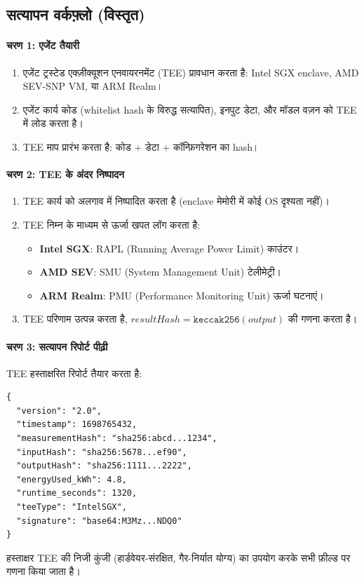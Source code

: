 \documentclass[11pt]{article}
\begin{document}
\begin{itemize}[noitemsep]
\begin{itemize}[noitemsep]
\subsection{सत्यापन वर्कफ़्लो (विस्तृत)}
\label{sec:attestation-workflow}
\paragraph{चरण 1: एजेंट तैयारी}
\begin{enumerate}[noitemsep]
  \item एजेंट ट्रस्टेड एक्ज़ीक्यूशन एनवायरनमेंट (TEE) प्रावधान करता है: Intel SGX enclave, AMD SEV-SNP VM, या ARM Realm।
  \item एजेंट कार्य कोड (whitelist hash के विरुद्ध सत्यापित), इनपुट डेटा, और मॉडल वज़न को TEE में लोड करता है।
  \item TEE माप प्रारंभ करता है: कोड + डेटा + कॉन्फ़िगरेशन का hash।
\end{enumerate}

\paragraph{चरण 2: TEE के अंदर निष्पादन}
\begin{enumerate}[noitemsep]
  \item TEE कार्य को अलगाव में निष्पादित करता है (enclave मेमोरी में कोई OS दृश्यता नहीं)।
  \item TEE निम्न के माध्यम से ऊर्जा खपत लॉग करता है:
    \begin{itemize}[noitemsep]
      \item \textbf{Intel SGX}: RAPL (Running Average Power Limit) काउंटर।
      \item \textbf{AMD SEV}: SMU (System Management Unit) टेलीमेट्री।
      \item \textbf{ARM Realm}: PMU (Performance Monitoring Unit) ऊर्जा घटनाएं।
    \end{itemize}
  \item TEE परिणाम उत्पन्न करता है, $resultHash = \texttt{keccak256}(output)$ की गणना करता है।
\end{enumerate}

\paragraph{चरण 3: सत्यापन रिपोर्ट पीढ़ी}
TEE हस्ताक्षरित रिपोर्ट तैयार करता है:
\begin{verbatim}
{
  "version": "2.0",
  "timestamp": 1698765432,
  "measurementHash": "sha256:abcd...1234",
  "inputHash": "sha256:5678...ef90",
  "outputHash": "sha256:1111...2222",
  "energyUsed_kWh": 4.8,
  "runtime_seconds": 1320,
  "teeType": "IntelSGX",
  "signature": "base64:M3Mz...NDQ0"
}
\end{verbatim}
हस्ताक्षर TEE की निजी कुंजी (हार्डवेयर-संरक्षित, गैर-निर्यात योग्य) का उपयोग करके सभी फ़ील्ड पर गणना किया जाता है।


\end{itemize}
\end{itemize}
\end{document}
